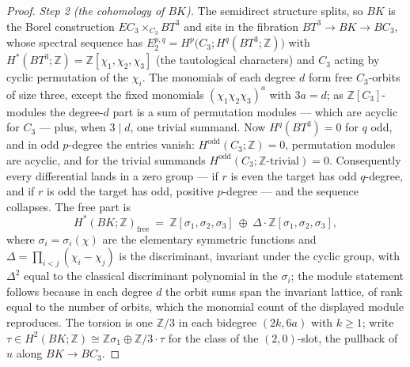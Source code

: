 \documentclass[11pt,a4paper]{article}
\begin{document}
\begin{proof}
\emph{Step 2 (the cohomology of $BK$).} The semidirect structure splits, so
$BK$ is the Borel construction $EC_3\times_{C_3}BT^3$ and sits in the
fibration $BT^3\to BK\to BC_3$, whose spectral sequence has
$E_2^{p,q}=H^p\bigl(C_3;H^q(BT^3;\mathbb Z)\bigr)$ with
$H^*(BT^3;\mathbb Z)=\mathbb Z[\chi_1,\chi_2,\chi_3]$ (the tautological
characters) and $C_3$ acting by cyclic permutation of the $\chi_i$. The
monomials of each degree $d$ form free $C_3$-orbits of size three, except
the fixed monomials $(\chi_1\chi_2\chi_3)^a$ with $3a=d$; as
$\mathbb Z[C_3]$-modules the degree-$d$ part is a sum of permutation modules
--- which are acyclic for $C_3$ --- plus, when $3\mid d$, one trivial
summand. Now $H^q(BT^3)=0$ for $q$ odd, and in odd $p$-degree the entries
vanish: $H^{\mathrm{odd}}(C_3;\mathbb Z)=0$, permutation modules are
acyclic, and for the trivial summands $H^{\mathrm{odd}}(C_3;\mathbb Z
\text{-trivial})=0$. Consequently every differential lands in a zero group
--- if $r$ is even the target has odd $q$-degree, and if $r$ is odd the
target has odd, positive $p$-degree --- and the sequence collapses. The
free part is
\[
H^*(BK;\mathbb Z)_{\mathrm{free}}\ =\ \mathbb Z[\sigma_1,\sigma_2,\sigma_3]\
\oplus\ \Delta\cdot\mathbb Z[\sigma_1,\sigma_2,\sigma_3],
\]
where $\sigma_i=\sigma_i(\chi)$ are the elementary symmetric functions and
$\Delta=\prod_{i<j}(\chi_i-\chi_j)$ is the discriminant, invariant under the
cyclic group, with $\Delta^2$ equal to the classical discriminant polynomial
in the $\sigma_i$; the module statement follows because in each degree $d$
the orbit sums span the invariant lattice, of rank equal to the number of
orbits, which the monomial count of the displayed module reproduces. The
torsion is one $\mathbb Z/3$ in each bidegree $(2k,6a)$ with $k\ge1$; write
$\tau\in H^2(BK;\mathbb Z)\cong\mathbb Z\sigma_1\oplus\mathbb Z/3\cdot\tau$
for the class of the $(2,0)$-slot, the pullback of $u$ along
$BK\to BC_3$.


\end{proof}
\end{document}
